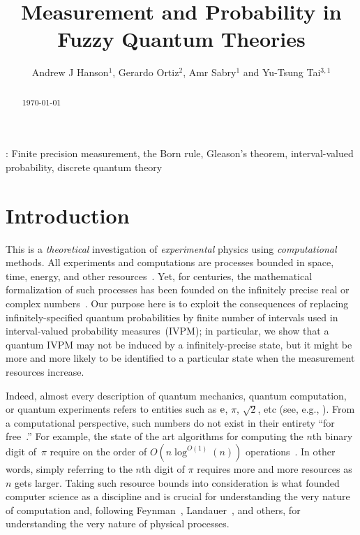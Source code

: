 \documentclass[12pt]{iopart}
\theoremstyle{remark}
\begin{document}
\title{Measurement and Probability in Fuzzy Quantum
Theories}

\author{Andrew J Hanson$^{1}$, Gerardo Ortiz$^{2}$,
Amr Sabry$^{1}$ and Yu-Tsung Tai$^{3,1}$}
\address{$^{1}$ School of Informatics and Computing, Indiana
University, Bloomington, IN 47405, USA}
\address{$^{2}$ Department of Physics, Indiana University, Bloomington, IN
47405, USA}
\address{$^{3}$ Department of Mathematics, Indiana University, Bloomington,
IN 47405, USA}
\begin{abstract}
\today
\end{abstract}
: {Finite precision measurement, the Born rule, Gleason's theorem, interval-valued
probability, discrete quantum theory}

\submitto{\jpa}

\section{Introduction}

This is a \emph{theoretical} investigation of \emph{experimental}
physics using \emph{computational} methods. All experiments and computations
are processes bounded in space, time, energy, and other resources~\cite{Jaeger2007,Piccinini2015}.
Yet, for centuries, the mathematical formalization of such processes
has been founded on the infinitely precise real or complex numbers~\cite{Ziegler2007,weihrauch2012computable,blum2012complexity}.
Our purpose here is to exploit the consequences of replacing infinitely-specified
quantum probabilities by finite number of intervals used in interval-valued
probability measures~(IVPM); in particular, we show that a quantum
IVPM may not be induced by a infinitely-precise state, but it might
be more and more likely to be identified to a particular state when
the measurement resources increase.

Indeed, almost every description of quantum mechanics, quantum computation,
or quantum experiments refers to entities such as $\mathrm{e}$, $\pi$,
$\sqrt{2}$, etc (see, e.g., \cite{Redhead1987-REDINA,544199,Mermin2007}).
From a computational perspective, such numbers do not exist in their
entirety ``for free~\cite{Kent1999,CliftonKent2000}.'' For example,
the state of the art algorithms for computing the $n$th binary digit
of~$\pi$ require on the order of $O\left(n\log^{O\left(1\right)}\left(n\right)\right)$
operations~\cite{journals/moc/BaileyBP97}. In other words, simply
referring to the $n$th digit of $\pi$ requires more and more resources
as $n$ gets larger. Taking such resource bounds into consideration
is what founded computer science as a discipline and is crucial for
understanding the very nature of computation and, following Feynman~\cite{Feynman1982Simulating},
Landauer~\cite{Landauer1996188}, and others, for understanding the
very nature of physical processes.
\end{document}
